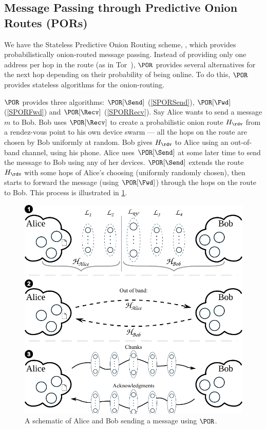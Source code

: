 
\subsection{Message Passing through Predictive Onion Routes (PORs)}
\label{sec:message_passing}


We have the Stateless Predictive Onion Routing scheme, \POR, which provides 
probabilistically onion-routed message passing.
Instead of providing only one address per hop in the route (as in \eg 
Tor~\cite{Tor}), \(\POR\) provides several alternatives for the next hop 
depending on their probability of being online.
To do this, \(\POR\) provides stateless algorithms for the onion-routing.

\(\POR\) provides three algorithms: \(\POR[\Send]\) (\cref{SPORSend}), 
\(\POR[\Fwd]\) (\cref{SPORFwd}) and \(\POR[\Recv]\) (\cref{SPORRecv}).
Say Alice wants to send a message \(m\) to Bob.
Bob uses \(\POR[\Recv]\) to create a probabilistic onion route \(H_\rdv\) from 
a rendez-vous point to his own device swarm --- all the hops on the route are 
chosen by Bob uniformly at random.
Bob gives \(H_\rdv\) to Alice using an out-of-band channel, \eg using his phone.
Alice uses \(\POR[\Send]\) at some later time to send the message to Bob using 
any of her devices.
\(\POR[\Send]\) extends the route \(H_\rdv\) with some hops of Alice's choosing 
(uniformly randomly chosen), then starts to forward the message (using 
\(\POR[\Fwd]\)) through the hops on the route to Bob.
This process is illustrated in \cref{fig:file-exchange}.

\begin{figure}
  \includegraphics[width=\linewidth]{figures/file_exchange_v2.pdf}
  \caption{\label{fig:file-exchange}%
    A schematic of Alice and Bob sending a message using \(\POR\).
  }
\end{figure}

